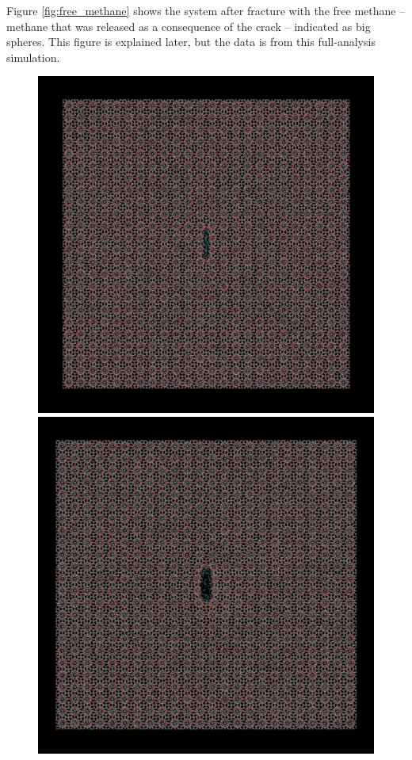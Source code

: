 Figure \ref{fig:free_methane} shows the system after fracture with the free methane -- methane that was released as a consequence of the crack -- indicated as big spheres. This figure is explained later, but the data is from this full-analysis simulation.

\begin{figure}
\begin{minipage}[b]{0.5\linewidth}
\includegraphics[width=\textwidth]{../snapshots/c_1.pdf}
\end{minipage}
\begin{minipage}[b]{0.5\linewidth}
\includegraphics[width=\textwidth]{../snapshots/c_2.pdf}

\end{minipage}
\end{figure}
